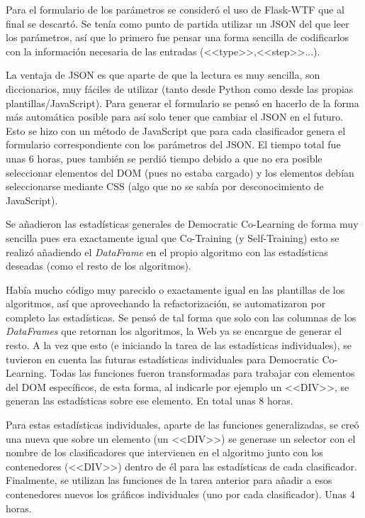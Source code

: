 Para el formulario de los parámetros se consideró el uso de Flask-WTF que al
final se descartó. Se tenía como punto de partida utilizar un JSON del que leer
los parámetros, así que lo primero fue pensar una forma sencilla de codificarlos
con la información necesaria de las entradas (<<type>>,<<step>>...). 

La ventaja de JSON es que aparte de que la lectura es muy sencilla, son
diccionarios, muy fáciles de utilizar (tanto desde Python como desde las propias
plantillas/JavaScript). Para generar el formulario se pensó en hacerlo de la
forma más automática posible para así solo tener que cambiar el JSON en el
futuro. Esto se hizo con un método de JavaScript que para cada clasificador
genera el formulario correspondiente con los parámetros del JSON. El tiempo
total fue unas 6 horas, pues también se perdió tiempo debido a que no era
posible seleccionar elementos del DOM (pues no estaba cargado) y los elementos
debían seleccionarse mediante CSS (algo que no se sabía por desconocimiento de
JavaScript).

Se añadieron las estadísticas generales de Democratic Co-Learning de forma muy
sencilla pues era exactamente igual que Co-Training (y Self-Training) esto se
realizó añadiendo el \textit{DataFrame} en el propio algoritmo con las
estadísticas deseadas (como el resto de los algoritmos).

Había mucho código muy parecido o exactamente igual en las plantillas de los
algoritmos, así que aprovechando la refactorización, se automatizaron por
completo las estadísticas. Se pensó de tal forma que solo con las columnas de
los \textit{DataFrames} que retornan los algoritmos, la Web ya se encargue de
generar el resto. A la vez que esto (e iniciando la tarea de las estadísticas
individuales), se tuvieron en cuenta las futuras estadísticas individuales para
Democratic Co-Learning. Todas las funciones fueron transformadas para trabajar
con elementos del DOM específicos, de esta forma, al indicarle por ejemplo un
<<DIV>>, se generan las estadísticas sobre ese elemento. En total unas 8 horas. 

Para estas estadísticas individuales, aparte de las funciones generalizadas, se
creó una nueva que sobre un elemento (un <<DIV>>) se generase un selector con el
nombre de los clasificadores que intervienen en el algoritmo junto con los
contenedores (<<DIV>>) dentro de él para las estadísticas de cada clasificador.
Finalmente, se utilizan las funciones de la tarea anterior para añadir a esos
contenedores nuevos los gráficos individuales (uno por cada clasificador). Unas
4 horas.

